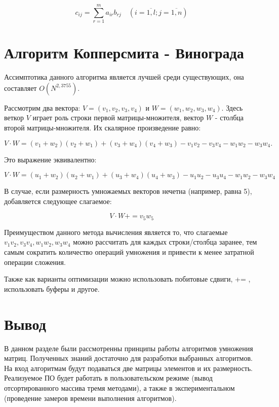 \begin{equation}
	c_{ij} =
	\sum_{r=1}^{m} a_{ir}b_{rj} \quad (i=\overline{1,l}; j=\overline{1,n})
\end{equation}

\section{Алгоритм Копперсмита - Винограда}

Ассимптотика данного алгоритма является лучшей среди существующих, она составляет $O(N^{2,3755})$.

Рассмотрим два вектора: $V = (v_1, v_2, v_3, v_4)$ и $W = (w_1, w_2, w_3, w_4)$. Здесь веткор $V$ играет роль строки первой матрицы-множителя, вектор $W$ - столбца второй матрицы-множителя. Их скалярное произведение равно:

\begin{equation}
	V \cdot W = (v_1 + w_2)(v_2 + w_1) + (v_3 + w_4)(v_4 + w_3) - v_1v_2 - v_3v_4 - w_1w_2 - w_3w_4.
\end{equation}

Это выражение эквивалентно:

\begin{equation}
	V \cdot W = (u_1 + w_2)(u_2 + w_1) + (u_3 + w_4)(u_4 + w_3) - u_1u_2 - u_3u_4 - w_1w_2 - w_3w_4
\end{equation}

В случае, если размерность умножаемых векторов нечетна (например, равна 5), добавляется следующее слагаемое:

\begin{equation}
	V \cdot W += v_5w_5 
\end{equation}

Преимуществом данного метода вычисления является то, что слагаемые $v_1v_2, v_3v_4, w_1w_2, w_3w_4$ можно рассчитать для каждых строки/столбца заранее, тем самым сократить количество операций умножения и привести к менее затратной операции сложения.

Также как варианты оптимизации можно использовать побитовые сдвиги, += , использовать буферы и другое.

\section{Вывод}

В данном разделе были рассмотренны принципы работы алгоритмов умножения матриц. Полученных знаний достаточно для разработки выбранных алгоритмов. На вход алгоритмам будут подаваться две матрицы элементов и их размерность. Реализуемое ПО будет работать в пользовательском режиме (вывод отсортированного массива тремя методами), а также в экспериментальном (проведение замеров времени выполнения алгоритмов).
